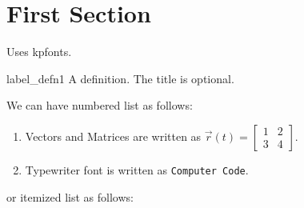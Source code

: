 \documentclass{worksheet}
\begin{document}
    \thispagestyle{empty}
	\maketitle
    \vspace{-1em}
	
 
	\section{First Section}
    
    Uses kpfonts.
	
	\begin{defn}{label_defn1}
	A definition. The title is optional.
	\end{defn}
	    
	We can have numbered list as follows:
    \begin{enumerate}
    
    \item  Vectors and Matrices are written as $\vec{r}(t)=\begin{bmatrix}1 & 2\\ 3 & 4\end{bmatrix}$.
    
    \item Typewriter font is written as {\tt Computer Code}.
    \end{enumerate}
    
    or itemized list as follows:
    
\end{document}
